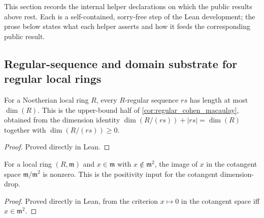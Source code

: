 This section records the internal helper declarations on which the public
results above rest. Each is a self-contained, sorry-free step of the Lean
development; the prose below states what each helper asserts and how it feeds
the corresponding public result.

\subsection{Regular-sequence and domain substrate for regular local rings}
\label{subsec:ab_regular_domain_substrate}

\begin{lemma}
  \label{lem:length_le_ringKrullDim_of_isRegular}
  For a Noetherian local ring \(R\), every \(R\)-regular sequence \(rs\) has length at
  most \(\dim(R)\). This is the upper-bound half of \cref{cor:regular_cohen_macaulay},
  obtained from the dimension identity \(\dim(R / (rs)) + |rs| = \dim(R)\) together with
  \(\dim(R / (rs)) \geq 0\).
\end{lemma}
\begin{proof}

\leanok
  Proved directly in Lean.
\end{proof}

\begin{lemma}
  \label{lem:toCotangent_ne_zero_of_not_mem_sq}
  For a local ring \((R, \mathfrak m)\) and \(x \in \mathfrak m\) with \(x \notin \mathfrak m^2\),
  the image of \(x\) in the cotangent space \(\mathfrak m / \mathfrak m^2\) is nonzero. This is
  the positivity input for the cotangent dimension-drop.
\end{lemma}
\begin{proof}

\leanok
  Proved directly in Lean, from the criterion \(x \mapsto 0\) in the cotangent space
  iff \(x \in \mathfrak m^2\).
\end{proof}

